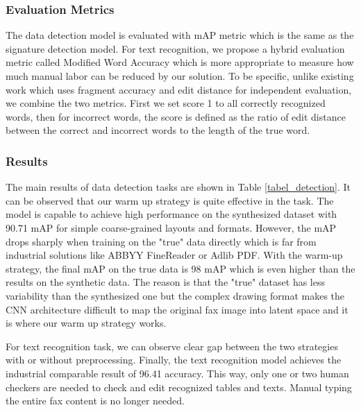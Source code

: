 \documentclass[sigconf]{acmart}
\begin{document}

\subsubsection*{\rm \textbf{Evaluation Metrics}}
The data detection model is evaluated with mAP metric which is the same as the signature detection model. For text recognition, we propose a hybrid evaluation metric called Modified Word Accuracy which is more appropriate to measure how much manual labor can be reduced by our solution. To be specific, unlike existing work \cite{borisyuk2018rosetta, shi2017end} which uses fragment accuracy and edit distance for independent evaluation, we combine the two metrics. First we set score 1 to all correctly recognized words, then for incorrect words, the score is defined as the ratio of edit distance between the correct and incorrect words to the length of the true word. 

\subsubsection*{\rm \textbf{Results}}
The main results of data detection tasks are shown in Table \ref{tabel_detection}. It can be observed that our warm up strategy is quite effective in the task. The model is capable to achieve high performance on the synthesized dataset with 90.71 mAP for  simple coarse-grained layouts and formats. However, the mAP drops sharply when training on the "true" data directly which is far from industrial solutions like ABBYY FineReader or Adlib PDF. With the warm-up strategy, the final mAP on the true data is 98 mAP which is even higher than the results on the synthetic data. The reason is that the "true" dataset has less variability than the synthesized one but the complex drawing format makes the CNN architecture difficult to map the original fax image into latent space and it is where our warm up strategy works.



For text recognition task, we can observe clear gap between the two strategies with or without preprocessing. Finally, the text recognition model achieves the industrial comparable result of 96.41 accuracy. This way, only one or two human checkers are
needed to check and edit recognized tables and texts. Manual typing the entire fax content is no longer needed.
\end{document}
